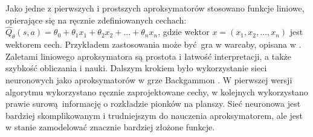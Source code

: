 Jako jedne z pierwszych i prostszych aproksymatorów stosowano funkcje liniowe, opierające się na ręcznie zdefiniowanych cechach: $\hat{Q}_{\theta}(s,a) = \theta_0 + \theta_1x_1 + \theta_2x_2 + ... + \theta_nx_n$, gdzie wektor $x = (x_1, x_2, …, x_n)$ jest wektorem cech. Przykładem zastosowania może być gra w warcaby, opisana w \cite{Samuel:1959:SML:1661923.1661924}. Zaletami liniowego aproksymatora są prostota i łatwość interpretacji, a także szybkość obliczania i nauki. 
Dalszym krokiem było wykorzystanie sieci neuronowych jako aproksymatorów w grze Backgammon \cite{Tesauro1992451}. W pierwszej wersji algorytmu wykorzystano ręcznie zaprojektowane cechy, w kolejnych wykorzystano prawie surową informację o rozkładzie pionków na planszy. Sieć neuronowa jest bardziej skomplikowanym i trudniejszym do nauczenia aproksymatorem, ale jest w stanie zamodelować znacznie bardziej złożone funkcje.
